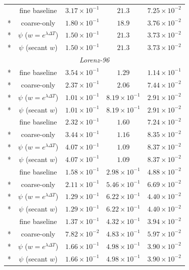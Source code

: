 \begin{longtable}{@{\extracolsep{\fill}}ccccc@{}}
\addlinespace[3pt]
\multirow{4}{*}{$128$} & fine baseline & $3.17\times 10^{-1}$ & $21.3$ & $7.25\times 10^{-2}$\\*
 & coarse-only & $1.80\times 10^{-1}$ & $18.9$ & $3.76\times 10^{-2}$\\*
 & $\psi$ ($w=e^{\lambda\Delta T}$) & $1.50\times 10^{-1}$ & $21.3$ & $3.73\times 10^{-2}$\\*
 & $\psi$ (secant $w$) & $1.50\times 10^{-1}$ & $21.3$ & $3.73\times 10^{-2}$\\
\midrule
\multicolumn{5}{c}{\textit{Lorenz-96}}\\*
\multirow{4}{*}{$16$} & fine baseline & $3.54\times 10^{-1}$ & $1.29$ & $1.14\times 10^{-1}$\\*
 & coarse-only & $2.37\times 10^{-1}$ & $2.06$ & $7.44\times 10^{-2}$\\*
 & $\psi$ ($w=e^{\lambda\Delta T}$) & $1.01\times 10^{-1}$ & $8.19\times 10^{-1}$ & $2.91\times 10^{-2}$\\*
 & $\psi$ (secant $w$) & $1.01\times 10^{-1}$ & $8.19\times 10^{-1}$ & $2.91\times 10^{-2}$\\
\addlinespace[3pt]
\multirow{4}{*}{$32$} & fine baseline & $2.32\times 10^{-1}$ & $1.60$ & $7.24\times 10^{-2}$\\*
 & coarse-only & $3.44\times 10^{-1}$ & $1.16$ & $8.35\times 10^{-2}$\\*
 & $\psi$ ($w=e^{\lambda\Delta T}$) & $4.07\times 10^{-1}$ & $1.09$ & $8.37\times 10^{-2}$\\*
 & $\psi$ (secant $w$) & $4.07\times 10^{-1}$ & $1.09$ & $8.37\times 10^{-2}$\\
\addlinespace[3pt]
\multirow{4}{*}{$64$} & fine baseline & $1.58\times 10^{-1}$ & $2.98\times 10^{-1}$ & $4.88\times 10^{-2}$\\*
 & coarse-only & $2.11\times 10^{-1}$ & $5.46\times 10^{-1}$ & $6.69\times 10^{-2}$\\*
 & $\psi$ ($w=e^{\lambda\Delta T}$) & $1.29\times 10^{-1}$ & $6.22\times 10^{-1}$ & $4.40\times 10^{-2}$\\*
 & $\psi$ (secant $w$) & $1.29\times 10^{-1}$ & $6.22\times 10^{-1}$ & $4.40\times 10^{-2}$\\
\addlinespace[3pt]
\multirow{4}{*}{$128$} & fine baseline & $1.37\times 10^{-1}$ & $4.32\times 10^{-1}$ & $3.94\times 10^{-2}$\\*
 & coarse-only & $7.82\times 10^{-2}$ & $4.83\times 10^{-1}$ & $5.97\times 10^{-2}$\\*
 & $\psi$ ($w=e^{\lambda\Delta T}$) & $1.66\times 10^{-1}$ & $4.98\times 10^{-1}$ & $3.90\times 10^{-2}$\\*
 & $\psi$ (secant $w$) & $1.66\times 10^{-1}$ & $4.98\times 10^{-1}$ & $3.90\times 10^{-2}$\\
\end{longtable}\endgroup
